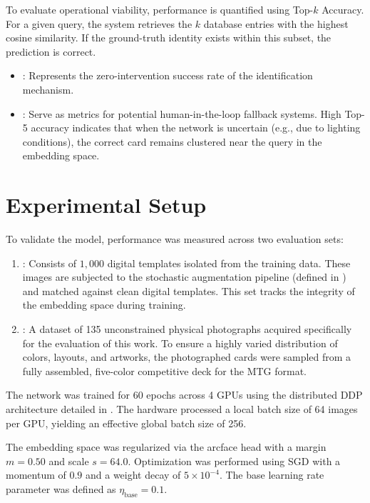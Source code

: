 To evaluate operational viability, performance is quantified using Top-$k$ Accuracy. For a given query, the system retrieves the $k$ database entries with the highest cosine similarity. If the ground-truth identity exists within this subset, the prediction is correct.

\begin{itemize}
    \item {}: Represents the zero-intervention success rate of the identification mechanism.
    \item {}: Serve as metrics for potential human-in-the-loop fallback systems. High Top-5 accuracy indicates that when the network is uncertain (e.g., due to lighting conditions), the correct card remains clustered near the query in the embedding space.
\end{itemize}

\section{Experimental Setup}
To validate the model, performance was measured across two evaluation sets:
\begin{enumerate}
    \item {}: Consists of $1,000$ digital templates isolated from the training data. These images are subjected to the stochastic augmentation pipeline (defined in ) and matched against clean digital templates. This set tracks the integrity of the embedding space during training.
    \item {}: A dataset of 135 unconstrained physical photographs acquired specifically for the evaluation of this work. To ensure a highly varied distribution of colors, layouts, and artworks, the photographed cards were sampled from a fully assembled, five-color competitive deck for the \ac{MTG}  format.
\end{enumerate}

The network was trained for 60 epochs across 4 GPUs using the distributed \ac{DDP} architecture detailed in . The hardware processed a local batch size of 64 images per GPU, yielding an effective global batch size of 256. 

The embedding space was regularized via the \ac{arcface} head with a margin $m=0.50$ and scale $s=64.0$. Optimization was performed using \ac{SGD} with a momentum of $0.9$ and a weight decay of $5 \times 10^{-4}$. The base learning rate parameter was defined as $\eta_{\text{base}} = 0.1$.

